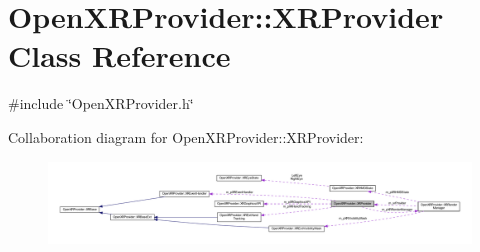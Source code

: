 \hypertarget{class_open_x_r_provider_1_1_x_r_provider}{}\section{Open\+X\+R\+Provider\+::X\+R\+Provider Class Reference}
\label{class_open_x_r_provider_1_1_x_r_provider}


{\ttfamily \#include \char`\"{}Open\+X\+R\+Provider.\+h\char`\"{}}



Collaboration diagram for Open\+X\+R\+Provider\+::X\+R\+Provider\+:\nopagebreak
\begin{figure}[H]
\begin{center}
\leavevmode
\includegraphics[width=350pt]{class_open_x_r_provider_1_1_x_r_provider__coll__graph}
\end{center}
\end{figure}
